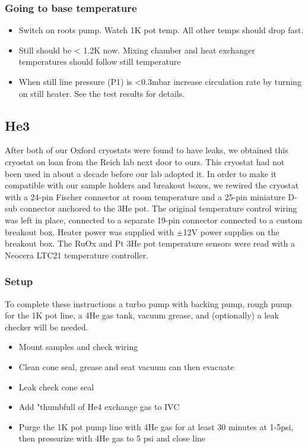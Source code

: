 \subsubsection*{Going to base temperature}

\begin{itemize}
\item Switch on roots pump. Watch 1K pot temp. All other temps should drop fast.
\item Still should be < 1.2K now. Mixing chamber and heat exchanger temperatures should follow still temperature
\item When still line pressure (P1) is <0.3mbar increase circulation rate by turning on still heater. See the test results for details.
\end{itemize}

\subsection{He3}


After both of our Oxford cryostats were found to have leaks, we obtained this cryostat on loan from the Reich lab next door to ours. This cryostat had not been used in about a decade before our lab adopted it. In order to make it compatible with our sample holders and breakout boxes, we rewired the cryostat with a 24-pin Fischer connector at room temperature and a 25-pin miniature D-sub connector anchored to the 3He pot. The original temperature control wiring was left in place, connected to a separate 19-pin connector connected to a custom breakout box. Heater power was supplied with $\pm$12V power supplies on the breakout box. The RuOx and Pt 3He pot temperature sensors were read with a Neocera LTC21 temperature controller.

\subsubsection*{Setup}

To complete these instructions a turbo pump with backing pump, rough pump for the 1K pot line, a 4He gas tank, vacuum grease, and (optionally) a leak checker will be needed.

\begin{itemize}
\item Mount samples and check wiring
\item Clean cone seal, grease and seat vacuum can then evacuate
\item Leak check cone seal
\item Add "thumbfull of He4 exchange gas to IVC
\item Purge the 1K pot pump line with 4He gas for at least 30 minutes at 1-5psi, then pressurize with 4He gas to 5 psi and close line
\end{itemize}

